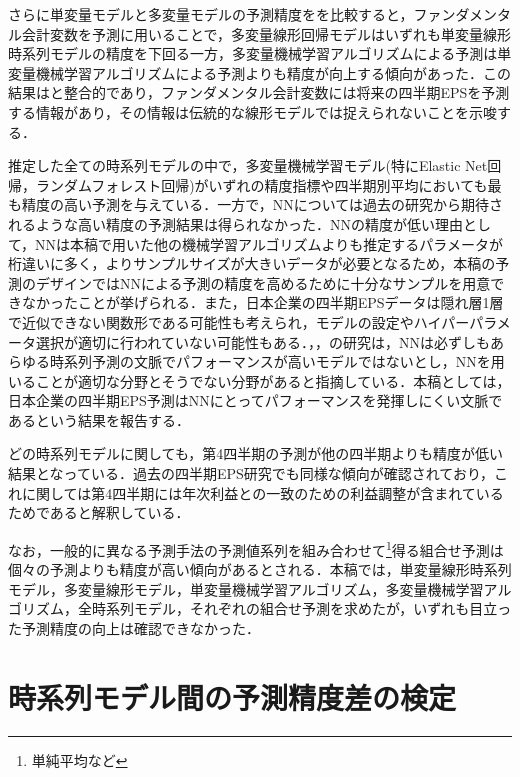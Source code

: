 \documentclass[a4paper，12pt]{jsarticle}
\begin{document}
さらに単変量モデルと多変量モデルの予測精度をを比較すると，ファンダメンタル会計変数を予測に用いることで，多変量線形回帰モデルはいずれも単変量線形時系列モデルの精度を下回る一方，多変量機械学習アルゴリズムによる予測は単変量機械学習アルゴリズムによる予測よりも精度が向上する傾向があった．この結果は\cite{zhang2004neural}と整合的であり，ファンダメンタル会計変数には将来の四半期EPSを予測する情報があり，その情報は伝統的な線形モデルでは捉えられないことを示唆する．

推定した全ての時系列モデルの中で，多変量機械学習モデル(特にElastic Net回帰，ランダムフォレスト回帰)がいずれの精度指標や四半期別平均においても最も精度の高い予測を与えている．一方で，NNについては過去の研究から期待されるような高い精度の予測結果は得られなかった．NNの精度が低い理由として，NNは本稿で用いた他の機械学習アルゴリズムよりも推定するパラメータが桁違いに多く，よりサンプルサイズが大きいデータが必要となるため，本稿の予測のデザインではNNによる予測の精度を高めるために十分なサンプルを用意できなかったことが挙げられる．また，日本企業の四半期EPSデータは隠れ層1層で近似できない関数形である可能性も考えられ，モデルの設定やハイパーパラメータ選択が適切に行われていない可能性もある．\cite{chatfield1993neural}，\cite{hill1994artificial}，\cite{callen1996neural}の研究は，NNは必ずしもあらゆる時系列予測の文脈でパフォーマンスが高いモデルではないとし，NNを用いることが適切な分野とそうでない分野があると指摘している．本稿としては，日本企業の四半期EPS予測はNNにとってパフォーマンスを発揮しにくい文脈であるという結果を報告する．

どの時系列モデルに関しても，第4四半期の予測が他の四半期よりも精度が低い結果となっている．過去の四半期EPS研究でも同様な傾向が確認されており，これに関して\cite{sakurai1990}は第4四半期には年次利益との一致のための利益調整が含まれているためであると解釈している．

なお，一般的に異なる予測手法の予測値系列を組み合わせて\footnote{単純平均など}得る組合せ予測\citep*{bates1969combination}は個々の予測よりも精度が高い傾向があるとされる．本稿では，単変量線形時系列モデル，多変量線形モデル，単変量機械学習アルゴリズム，多変量機械学習アルゴリズム，全時系列モデル，それぞれの組合せ予測を求めたが，いずれも目立った予測精度の向上は確認できなかった．

\section{時系列モデル間の予測精度差の検定}
\end{document}
